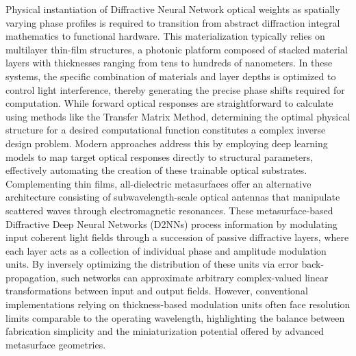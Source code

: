 \documentclass[11pt]{article}
\begin{document}
Physical instantiation of Diffractive Neural Network optical weights as spatially varying phase profiles is required to transition from abstract diffraction integral mathematics to functional hardware. This materialization typically relies on multilayer thin-film structures, a photonic platform composed of stacked material layers with thicknesses ranging from tens to hundreds of nanometers. \citep{doi_10_1039_d5nh00367a_1be9a889} \citep{doi_10_1002_smtd_202400087_8e52a90c} In these systems, the specific combination of materials and layer depths is optimized to control light interference, thereby generating the precise phase shifts required for computation. While forward optical responses are straightforward to calculate using methods like the Transfer Matrix Method, determining the optimal physical structure for a desired computational function constitutes a complex inverse design problem. Modern approaches address this by employing deep learning models to map target optical responses directly to structural parameters, effectively automating the creation of these trainable optical substrates. Complementing thin films, all-dielectric metasurfaces offer an alternative architecture consisting of subwavelength-scale optical antennas that manipulate scattered waves through electromagnetic resonances. \citep{doi_10_1088_1612_202x_ab2121_c375efca} \citep{doi_10_1109_mac64480_2025_11140514_7f08c073} These metasurface-based Diffractive Deep Neural Networks (D2NNs) process information by modulating input coherent light fields through a succession of passive diffractive layers, where each layer acts as a collection of individual phase and amplitude modulation units. By inversely optimizing the distribution of these units via error back-propagation, such networks can approximate arbitrary complex-valued linear transformations between input and output fields. However, conventional implementations relying on thickness-based modulation units often face resolution limits comparable to the operating wavelength, highlighting the balance between fabrication simplicity and the miniaturization potential offered by advanced metasurface geometries. \citep{doi_10_1016_j_isci_2025_112222_1f7c10f5} \citep{doi_10_1515_nanoph_2023_0760_2c3ec088}
\end{document}
